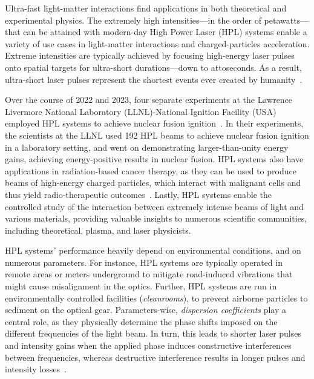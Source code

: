Ultra-fast light-matter interactions find applications in both theoretical and experimental physics. The extremely high intensities---in the order of petawatts---that can be attained with modern-day High Power Laser (HPL) systems enable a variety of use cases in light-matter interactions and charged-particles acceleration.
Extreme intensities are typically achieved by focusing high-energy laser pulses onto spatial targets for ultra-short durations---down to attoseconds. As a result, ultra-short laser pulses represent the shortest events ever created by humanity~\citep{gaumnitz2017streaking}.

Over the course of 2022 and 2023, four separate experiments at the Lawrence Livermore National Laboratory (LLNL)-National Ignition Facility (USA) employed HPL systems to achieve nuclear fusion ignition~\citep{abu2024achievement}. 
In their experiments, the scientists at the LLNL used 192 HPL beams to achieve nuclear fusion ignition in a laboratory setting, and went on demonstrating larger-than-unity energy gains, achieving energy-positive results in nuclear fusion. 
HPL systems also have applications in radiation-based cancer therapy, as they can be used to produce beams of high-energy charged particles, which interact with malignant cells and thus yield radio-therapeutic outcomes~\citep{grittani2020device}. 
Lastly, HPL systems enable the controlled study of the interaction between extremely intense beams of light and various materials, providing valuable insights to numerous scientific communities, including theoretical, plasma, and laser physicists.

HPL systems' performance heavily depend on environmental conditions, and on numerous parameters. For instance, HPL systems are typically operated in remote areas or meters underground to mitigate road-induced vibrations that might cause misalignment in the optics. 
Further, HPL systems are run in environmentally controlled facilities (\textit{cleanrooms}), to prevent airborne particles to sediment on the optical gear. 
Parameters-wise, \textit{dispersion coefficients} play a central role, as they physically determine the phase shifts imposed on the different frequencies of the light beam. 
In turn, this leads to shorter laser pulses and intensity gains when the applied phase induces constructive interferences between frequencies, whereas destructive interference results in longer pulses and intensity losses~\citep{paschotta2008field}.

